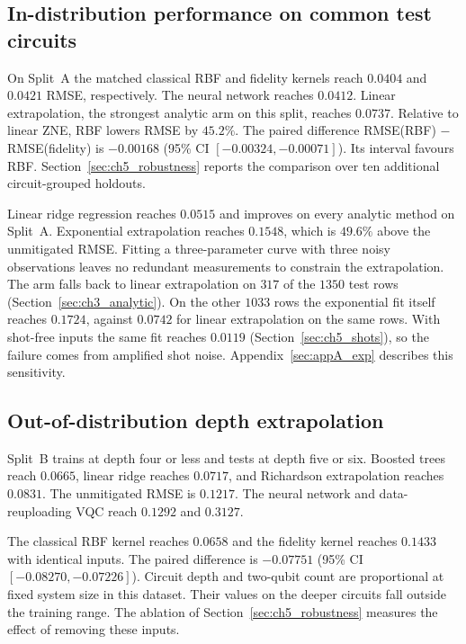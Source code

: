 \documentclass[Thesis.tex]{subfiles}
\begin{document}
\subsection{In-distribution performance on common test circuits}

On Split~A the matched classical RBF and fidelity kernels reach
$0.0404$ and $0.0421$ RMSE, respectively. The neural
network reaches $0.0412$. Linear extrapolation, the strongest
analytic arm on this split, reaches $0.0737$. Relative to linear ZNE, RBF
lowers RMSE by $45.2\%$. The paired difference
RMSE(RBF) $-$ RMSE(fidelity) is $-0.00168$ (95\% CI $[-0.00324,\allowbreak -0.00071]$).
Its interval favours RBF. Section~\ref{sec:ch5_robustness} reports
the comparison over ten additional circuit-grouped holdouts.

Linear ridge regression reaches $0.0515$ and improves on every analytic method
on Split~A. Exponential extrapolation reaches $0.1548$, which is $49.6\%$ above
the unmitigated RMSE. Fitting a three-parameter curve with three noisy observations
leaves no redundant measurements to constrain the extrapolation.
The arm falls back to linear extrapolation on $317$ of the $1350$ test rows
(Section~\ref{sec:ch3_analytic}). On the other $1033$ rows the exponential fit itself
reaches $0.1724$, against $0.0742$ for linear extrapolation on the same rows. With
shot-free inputs the same fit reaches $0.0119$ (Section~\ref{sec:ch5_shots}), so the
failure comes from amplified shot noise. Appendix~\ref{sec:appA_exp} describes this
sensitivity.

\subsection{Out-of-distribution depth extrapolation}

Split~B trains at depth four or less and tests at depth five or six. Boosted
trees reach $0.0665$, linear ridge reaches
$0.0717$, and Richardson extrapolation reaches
$0.0831$. The unmitigated RMSE is
$0.1217$. The neural network and data-reuploading VQC reach $0.1292$ and $0.3127$.

The classical RBF kernel reaches $0.0658$ and the
fidelity kernel reaches $0.1433$ with identical inputs.
The paired difference is $-0.07751$ (95\% CI $[-0.08270,\allowbreak -0.07226]$). Circuit depth and
two-qubit count are proportional at fixed system size in this dataset.
Their values on the deeper circuits fall outside the training range.
The ablation of Section~\ref{sec:ch5_robustness} measures the effect
of removing these inputs.
\end{document}
